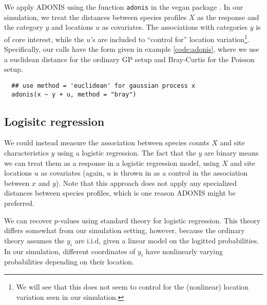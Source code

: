 \documentclass{article}
\newenvironment{code}{\captionsetup{type=listing}}{}
\begin{document}


We apply ADONIS using the function \texttt{adonis} in the vegan package
\citep{oksanen2007vegan}. In our simulation, we treat the distances between
species profiles $X$ as the response and the category $y$ and locations $u$ as
covariates. The associations with categories $y$ is of core interest, while the
$u$'s are included to ``control for'' location variation\footnote{We will see
  that this does not seem to control for the (nonlinear) location variation seen
  in our simulation.}. Specifically, our calls have the form given in example
\ref{code:adonis}, where we use a euclidean distance for the ordinary GP setup
and Bray-Curtis for the Poisson setup.

\begin{code}
\begin{verbatim}
  ## use method = 'euclidean' for gaussian process x
  adonis(x ~ y + u, method = "bray")
\end{verbatim}
\label{code:adonis}
\end{code}

\subsection{Logisitc regression}
\label{subsec:logistic_regression}

We could instead measure the association between species counts $X$ and site
characteristics $y$ using a logistic regression. The fact that the $y$ are
binary means we can treat them as a response in a logistic regression model,
using $X$ and site locations $u$ as covariates (again, $u$ is thrown in as a
control in the association between $x$ and $y$). Note that this approach does
not apply any specialized distances between species profiles, which is one
reason ADONIS might be preferred.

We can recover $p$-values using standard theory for logistic regression. This
theory differs somewhat from our simulation setting, however, because the
ordinary theory assumes the $y_{i}$ are i.i.d, given a linear model on the
logitted probabilities. In our simulation, different coordinates of $y_{i}$ have
nonlinearly varying probabilities depending on their location.
\end{document}
